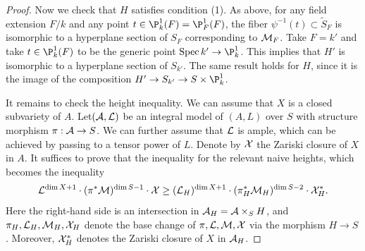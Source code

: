 \begin{proof}
Now we check that $H$ satisfies condition (1).
As above, for any field extension $F/k$ and any point $t\in \P^1_k(F)=\P^1_F(F)$, the fiber $\psi^{-1}(t)\subset \widetilde S_F$ is isomorphic to a hyperplane section of $S_F$ corresponding to ${\mathcal M}_F$.
Take $F=k'$ and take
$t\in \P^1_k(F)$ to be the generic point $\Spec k'\to \P^1_k$.
This implies that $H'$ is isomorphic to a hyperplane section of $S_{k'}$.
The same result holds for $H$, since it is the image of the composition $H'\to S_{k'} \to S\times \P^1_k$.

It remains to check the height inequality.
We can assume that $X$ is a closed subvariety of $A$.
Let$({\mathcal A},{\mathcal L})$ be an integral model of $(A,L)$ over $S$ with structure morphism $\pi:{\mathcal A}\to S$.
We can further assume that ${\mathcal L}$ is ample, which can be achieved by passing to a tensor power of $L$.
Denote by ${\mathcal X}$ the Zariski closure of $X$ in $A$.
It suffices to prove that the inequality for the relevant naive heights, which becomes the inequality
$$
{\mathcal L}^{\dim X+1}\cdot (\pi^*{\mathcal M})^{\dim S-1} \cdot {\mathcal X}
\geq ({\mathcal L}_H)^{\dim X+1}\cdot (\pi_H^*{\mathcal M}_H)^{\dim S-2} \cdot {\mathcal X}_H^*.
$$
Here the right-hand side is an intersection in ${\mathcal A}_H={\mathcal A}\times_SH$, and $\pi_H,{\mathcal L}_H,{\mathcal M}_H, {\mathcal X}_H$ denote the base change of $\pi,{\mathcal L},{\mathcal M}, {\mathcal X}$ via the morphism $H\to S$.
Moreover, ${\mathcal X}_H^*$ denotes the Zariski closure of $X$ in ${\mathcal A}_H$.


\end{proof}
